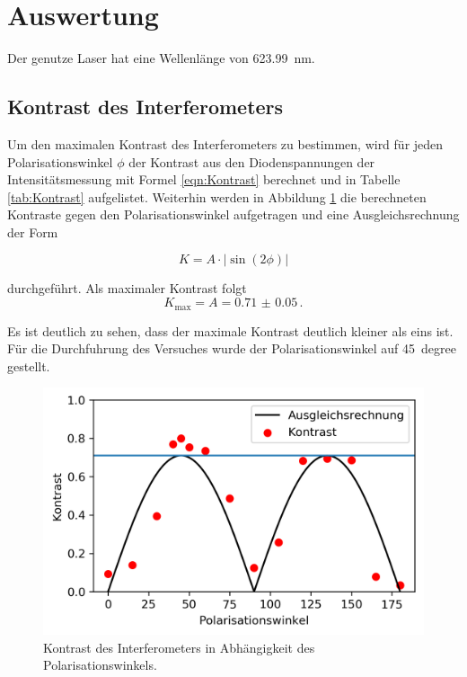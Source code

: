 \section{Auswertung}
Der genutze Laser hat eine Wellenlänge von \SI{623.99}{\nano\meter}.

\subsection{Kontrast des Interferometers}
Um den maximalen Kontrast des Interferometers zu bestimmen, wird für jeden Polarisationswinkel $\phi$  der Kontrast aus den Diodenspannungen der Intensitätsmessung mit Formel \ref{eqn:Kontrast} berechnet und in Tabelle \ref{tab:Kontrast} aufgelistet.
Weiterhin werden in Abbildung \ref{fig:Kontrast} die berechneten Kontraste gegen den Polarisationswinkel aufgetragen und eine Ausgleichsrechnung der Form

\begin{equation*}
  K = A \cdot |\sin(2 \phi)|
\end{equation*}

durchgeführt. Als maximaler Kontrast folgt
\begin{equation}
  K_\text{max} = A = \num{0.71(5)} \, .
  \label{eqn:Kontrast}
\end{equation}

Es ist deutlich zu sehen, dass der maximale Kontrast deutlich kleiner als eins ist. Für die Durchfuhrung des Versuches wurde der Polarisationswinkel auf \SI{45}{degree} gestellt.

\begin{figure}[H]
  \centering
  \includegraphics[width = .5\textwidth]{Auswertung/Plots/Kontrast.png}
  \caption{Kontrast des Interferometers in Abhängigkeit des Polarisationswinkels. }
  \label{fig:Kontrast}
\end{figure}

